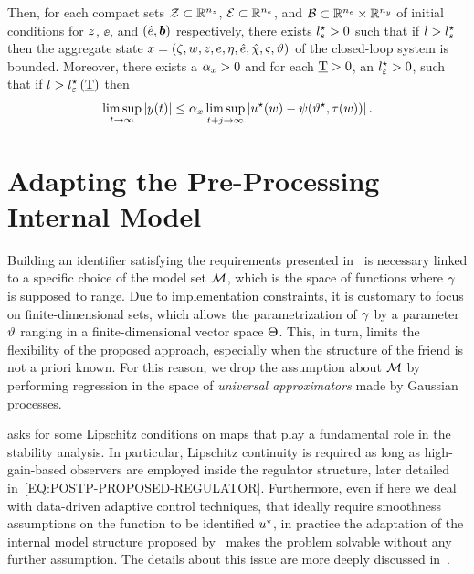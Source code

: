 Then, for each compact sets $\mathcal{Z} \subset \mathbb{R}^{n_{z}}$, $\mathcal{E} \subset \mathbb{R}^{n_{e}}$, and $\mathcal{B} \subset \mathbb{R}^{n_{e}} \times \mathbb{R}^{n_{y}}$
of initial conditions for $z$, $\ee$, and $\left( \hat{e}, \boldsymbol{b} \right)$ respectively, there exists $l_{s}^{\star} > 0$ such that if $l > l_{s}^{\star}$
then the aggregate state $x = (\zeta, w, z, e, \eta, \hat{e}, \hat{\chi}, \varsigma, \vartheta)$ of the closed-loop system is bounded.
Moreover, there exists a $\alpha_{x} > 0$ and for each $\underline{\text{T}} > 0$, an $l_{\varepsilon}^{\star} > 0$, such that if
$l > l_{\varepsilon}^{\star} \left( \underline{\text{T}} \right)$ then
\begin{equation*}
   \limsup_{t \rightarrow \infty} \left| y(t) \right| \le \alpha_{x} \limsup_{t+j \rightarrow \infty} \left| u^{\star}(w) - \psi(\vartheta^{\star}, \tau(w)) \right|.
\end{equation*}

\section{Adapting the Pre-Processing Internal Model}
Building an identifier satisfying the requirements presented in~ is necessary linked
to a specific choice of the model set $\mathcal{M}$, which is the space of functions where $\gamma$ is supposed to range.
Due to implementation constraints, it is customary to focus on finite-dimensional sets, which allows the parametrization of $\gamma$
by a parameter $\vartheta$ ranging in a finite-dimensional vector space $\Theta$. This, in turn, limits the flexibility of the
proposed approach, especially when the structure of the friend is not a priori known.
For this reason, we drop the assumption about $\mathcal{M}$ by performing regression in the space of \emph{universal approximators} made by
Gaussian processes.
\begin{remark}
	 asks for some Lipschitz conditions on maps that play a
	fundamental role in the stability analysis. In particular, Lipschitz continuity is required as long as high-gain-based observers are
	employed inside the regulator structure, later detailed in~\eqref{EQ:POSTP-PROPOSED-REGULATOR}.
	Furthermore, even if here we deal with data-driven adaptive control techniques, that ideally require smoothness assumptions
	on the function to be identified $u^{\star}$, in practice the adaptation of the internal model structure proposed by~\cite{marconi2007output}
	makes the problem solvable without any further assumption. The details about this issue are more deeply discussed in~.
\end{remark}

